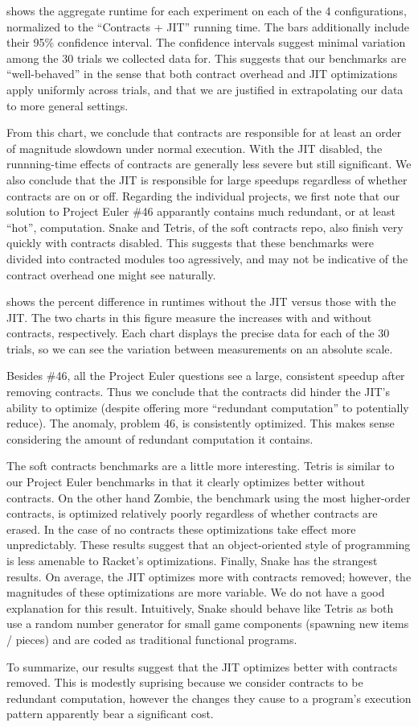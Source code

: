 

 shows the aggregate runtime for each experiment on each of the 4 configurations, normalized to the ``Contracts + JIT'' running time.
The bars additionally include their 95\% confidence interval.
The confidence intervals suggest minimal variation among the 30 trials we collected data for.
This suggests that our benchmarks are ``well-behaved'' in the sense that both contract overhead and JIT optimizations apply uniformly across trials, and that we are justified in extrapolating our data to more general settings.

From this chart, we conclude that contracts are responsible for at least an order of magnitude slowdown under normal execution.
With the JIT disabled, the runnning-time effects of contracts are generally less severe but still significant.
We also conclude that the JIT is responsible for large speedups regardless of whether contracts are on or off.
Regarding the individual projects, we first note that our solution to Project Euler \#46 apparantly contains much redundant, or at least ``hot'', computation.
Snake and Tetris, of the soft contracts repo, also finish very quickly with contracts disabled.
This suggests that these benchmarks were divided into contracted modules too agressively, and may not be indicative of the contract overhead one might see naturally.

\newpage


 shows the percent difference in runtimes without the JIT versus those with the JIT.
The two charts in this figure measure the increases with and without contracts, respectively.
Each chart displays the precise data for each of the 30 trials, so we can see the variation between measurements on an absolute scale.

Besides \#46, all the Project Euler questions see a large, consistent speedup after removing contracts.
Thus we conclude that the contracts did hinder the JIT's ability to optimize (despite offering more ``redundant computation'' to potentially reduce).
The anomaly, problem 46, is consistently optimized.
This makes sense considering the amount of redundant computation it contains.

The soft contracts benchmarks are a little more interesting.
Tetris is similar to our Project Euler benchmarks in that it clearly optimizes better without contracts.
On the other hand Zombie, the benchmark using the most higher-order contracts, is optimized relatively poorly regardless of whether contracts are erased.
In the case of no contracts these optimizations take effect more unpredictably.
These results suggest that an object-oriented style of programming is less amenable to Racket's optimizations.
Finally, Snake has the strangest results.
On average, the JIT optimizes more with contracts removed; however, the magnitudes of these optimizations are more variable.
We do not have a good explanation for this result.
Intuitively, Snake should behave like Tetris as both use a random number generator for small game components (spawning new items / pieces) and are coded as traditional functional programs.

To summarize, our results suggest that the JIT optimizes better with contracts removed.
This is modestly suprising because we consider contracts to be redundant computation, however the changes they cause to a program's execution pattern apparently bear a significant cost.

